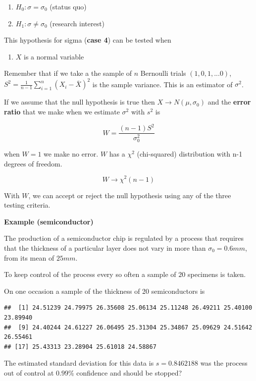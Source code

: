 \documentclass[
]{book}
\providecommand{\tightlist}{%
  \setlength{\itemsep}{0pt}\setlength{\parskip}{0pt}}
\begin{document}
\begin{enumerate}
\def\labelenumi{\alph{enumi}.}
\tightlist
\item
  \(H_0:\sigma = \sigma_0\) (status quo)
\item
  \(H_1:\sigma \neq \sigma_0\) (research interest)
\end{enumerate}

This hypothesis for sigma (\textbf{case 4}) can be tested when

\begin{enumerate}
\def\labelenumi{\arabic{enumi}.}
\tightlist
\item
  \(X\) is a normal variable
\end{enumerate}

Remember that if we take a the sample of \(n\) Bernoulli trials \((1,0,1,...0)\), \(S^2=\frac{1}{n-1}\sum_{i=1}^n (X_i-\bar{X})^2\) is the sample variance. This is an estimator of \(\sigma^2\).

If we assume that the null hypothesis is true then \(X \rightarrow N(\mu, \sigma_0)\) and the \textbf{error ratio} that we make when we estimate \(\sigma^2\) with \(s^2\) is

\[W=\frac{(n-1)S^2}{\sigma_0^2}\]

when \(W=1\) we make no error. \(W\) has a \(\chi^2\) (chi-squared) distribution with n-1 degrees of freedom.

\[W \rightarrow \chi^2(n-1)\]

With \(W\), we can accept or reject the null hypothesis using any of the three testing criteria.

\textbf{Example (semiconductor)}

The production of a semiconductor chip is regulated by a process that requires that the thickness of a particular layer does not vary in more than \(\sigma_0=0.6mm\), from its mean of \(25mm\).

To keep control of the process every so often a sample of \(20\) specimens is taken.

On one occasion a sample of the thickness of 20 semiconductors is

\begin{verbatim}
##  [1] 24.51239 24.79975 26.35608 25.06134 25.11248 26.49211 25.40100 23.89940
##  [9] 24.40244 24.61227 26.06495 25.31304 25.34867 25.09629 24.51642 26.55461
## [17] 25.43313 23.28904 25.61018 24.58867
\end{verbatim}

The estimated standard deviation for this data is \(s=0.8462188\) was the process out of control at \(0.99\%\) confidence and should be stopped?
\end{document}
